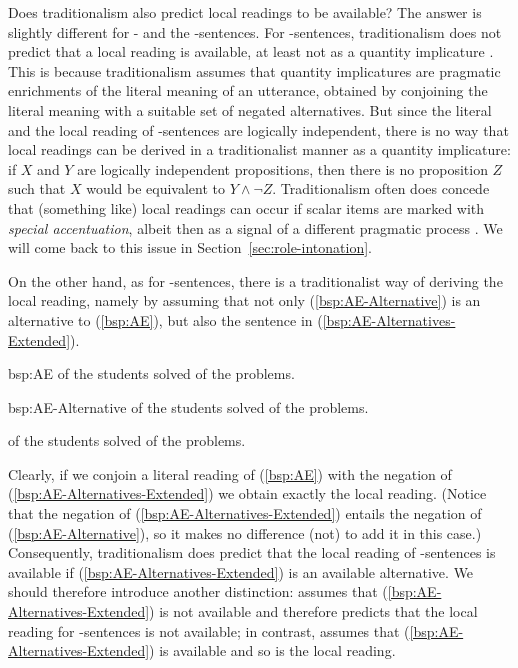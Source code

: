 \documentclass[fleqn,reqno,10pt,draft]{article}
\newcommand{\as}{\acro{as}}
\renewcommand{\es}{\acro{es}}
\begin{document}
Does traditionalism also predict local readings to be available?  The
answer is slightly different for \as- and the \es-sentences. For
\es-sentences, traditionalism does not predict that a local reading is
available, at least not as a quantity implicature
\citep[c.f.][]{GeurtsPouscoulous2009:Embedded-Implic,ChemlaSpector2010:Experimental-Ev}. This
is because traditionalism assumes that quantity implicatures are
pragmatic enrichments of the literal meaning of an utterance, obtained
by conjoining the literal meaning with a suitable set of negated
alternatives. But since the literal and the local reading of
\es-sentences are logically independent, there is no way that local
readings can be derived in a traditionalist manner as a quantity
implicature: if $X$ and $Y$ are logically independent propositions,
then there is no proposition $Z$ such that $X$ would be equivalent to
$Y \wedge \neg Z$. Traditionalism often does concede that (something
like) local readings can occur if scalar items are marked with
\emph{special accentuation}, albeit then as a signal of a different
pragmatic process
\citep[e.g.][]{Horn2006:The-Border-Wars,Geurts2009:Scalar-Implicat,Geurts2010:Quantity-Implic}. We
will come back to this issue in Section~\ref{sec:role-intonation}.

On the other hand, as for \as-sentences, there is a traditionalist way
of deriving the local reading, namely by assuming that not only
(\ref{bsp:AE-Alternative}) is an alternative to (\ref{bsp:AE}), but
also the sentence in (\ref{bsp:AE-Alternatives-Extended}).

\begin{exer}{bsp:AE}
  \ex {} of the students solved  of the problems.
\end{exer}

\begin{exer}{bsp:AE-Alternative}
  \ex {} of the students solved  of the problems.
\end{exer}

\begin{exe}
\ex \label{bsp:AE-Alternatives-Extended}  of the students solved  of the problems.
\end{exe}

\noindent Clearly, if we conjoin a literal reading of (\ref{bsp:AE})
with the negation of (\ref{bsp:AE-Alternatives-Extended}) we obtain
exactly the local reading. (Notice that the negation of
(\ref{bsp:AE-Alternatives-Extended}) entails the negation of
(\ref{bsp:AE-Alternative}), so it makes no difference (not) to add it
in this case.) Consequently, traditionalism does predict that the
local reading of \as-sentences is available if
(\ref{bsp:AE-Alternatives-Extended}) is an available alternative. We
should therefore introduce another distinction:  assumes that (\ref{bsp:AE-Alternatives-Extended}) is
not available and therefore predicts that the local reading for
\as-sentences is not available; in contrast,  assumes that (\ref{bsp:AE-Alternatives-Extended}) is
available and so is the local reading.
\end{document}
